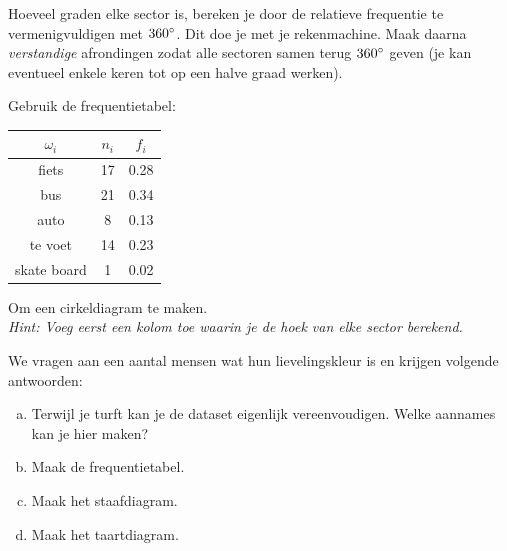 \documentclass[12pt,twoside,a4paper]{article}
\begin{document}
Hoeveel graden elke sector is, bereken je door de relatieve frequentie te vermenigvuldigen met $360^\circ$. Dit doe je met je rekenmachine. Maak daarna {\em verstandige} afrondingen zodat alle sectoren samen terug $360^\circ$ geven (je kan eventueel enkele keren tot op een halve graad werken).

\begin{oefening}
Gebruik de frequentietabel:
\begin{center}
  \begin{tabular}{c|c|c}
    $\omega_i$ & $n_i$ & $f_i$\\
    \hline
    fiets      & 17    & 0.28\\
    bus        & 21    & 0.34\\
    auto       &  8    & 0.13\\
    te voet    & 14    & 0.23\\
    skate board&  1    & 0.02\\
  \end{tabular}
\end{center}
Om een cirkeldiagram te maken.\\
{\em Hint: Voeg eerst een kolom toe waarin je de hoek van elke sector berekend.}
\end{oefening}

\begin{oefening}
We vragen aan een aantal mensen wat hun lievelingskleur is en krijgen volgende antwoorden:
\begin{enumerate}[(a)]
\item Terwijl je turft kan je de dataset eigenlijk vereenvoudigen. Welke aannames kan je hier maken?
\item Maak de frequentietabel.
\item Maak het staafdiagram.
\item Maak het taartdiagram.
\end{enumerate}
\end{oefening}
\end{document}

